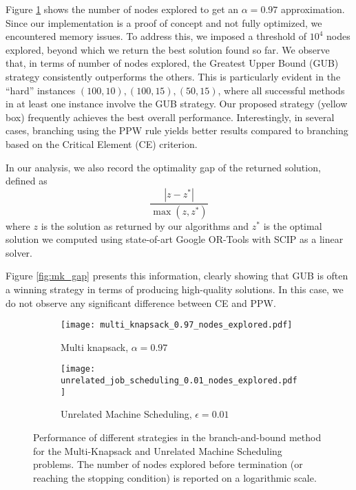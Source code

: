 \documentclass[a4paper,UKenglish,cleveref, autoref, thm-restate, pdfa]{lipics-v2021}
\theoremstyle{plain}
\begin{document}
Figure \ref{fig:mk_nodes} shows the number of nodes explored to get an $\alpha = 0.97$ approximation. Since our implementation is a proof of concept and not fully optimized, we encountered memory issues. To address this, we imposed a threshold of $10^4$ nodes explored, beyond which we return the best solution found so far.
We observe that, in terms of number of nodes explored, the Greatest Upper Bound (GUB) strategy consistently outperforms the others. This is particularly evident in the ``hard'' instances $(100, 10), (100, 15), (50, 15)$, where all successful methods in at least one instance involve the GUB strategy.
Our proposed strategy (yellow box) frequently achieves the best overall performance.
Interestingly, in several cases, branching using the PPW rule yields better results compared to branching based on the Critical Element (CE) criterion.

In our analysis, we also record the optimality gap of the returned solution, defined as 
\[\frac{|z - z^*|}{\max(z,z^*)} \]
where $z$ is the solution as returned by our algorithms and $z^*$ is the optimal solution we computed using state-of-art Google OR-Tools \cite{ortools} with SCIP \cite{scip} as a linear solver. 


Figure \ref{fig:mk_gap} presents this information, clearly showing that GUB is often a winning strategy in terms of producing high-quality solutions. In this case, we do not observe any significant difference between CE and PPW.


\begin{figure}
\centering
\begin{subfigure}{0.5\textwidth}
\centering
    \texttt{[image: multi\_knapsack\_0.97\_nodes\_explored.pdf]}
    \caption{Multi knapsack, $\alpha = 0.97$}
    \label{fig:mk_nodes}
\end{subfigure}\begin{subfigure}{0.5\textwidth}
\centering
    \texttt{[image: unrelated\_job\_scheduling\_0.01\_nodes\_explored.pdf]}
    \caption{Unrelated Machine Scheduling, $\epsilon = 0.01$}
    \label{fig:ujs_nodes}
\end{subfigure}
\caption{Performance of different strategies in the branch-and-bound method for the Multi-Knapsack and Unrelated Machine Scheduling problems. The number of nodes explored before termination (or reaching the stopping condition) is reported on a logarithmic scale.}
\label{fig:nodes}
\end{figure}
\end{document}
